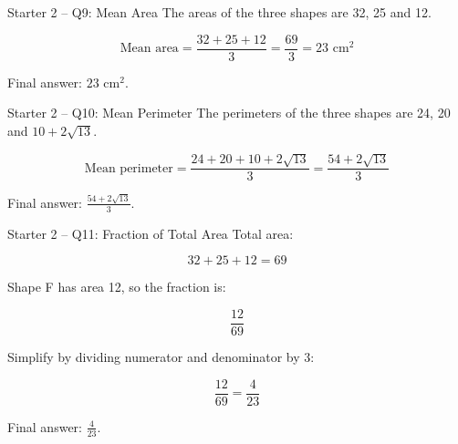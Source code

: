 \documentclass{beamer}
\begin{document}
\begin{frame}{Starter 2 -- Q9: Mean Area}
\small
The areas of the three shapes are 32, 25 and 12.

\[
\text{Mean area}=\frac{32+25+12}{3}=\frac{69}{3}=23\text{ cm}^2
\]

Final answer: \(\boxed{23\text{ cm}^2}\).
\end{frame}

\begin{frame}{Starter 2 -- Q10: Mean Perimeter}
\small
The perimeters of the three shapes are 24, 20 and \(10+2\sqrt{13}\).

\[
\text{Mean perimeter}
=\frac{24+20+10+2\sqrt{13}}{3}
=\frac{54+2\sqrt{13}}{3}
\]

Final answer: \(\boxed{\frac{54+2\sqrt{13}}{3}}\).
\end{frame}

\begin{frame}{Starter 2 -- Q11: Fraction of Total Area}
\small
Total area:

\[
32+25+12=69
\]

Shape F has area 12, so the fraction is:

\[
\frac{12}{69}
\]

Simplify by dividing numerator and denominator by 3:

\[
\frac{12}{69}=\frac{4}{23}
\]

Final answer: \(\boxed{\frac{4}{23}}\).
\end{frame}
\end{document}
